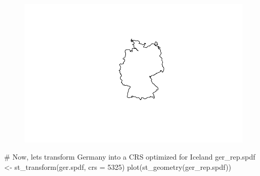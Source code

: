 \documentclass[
  letterpaper,
  DIV=11,
  numbers=noendperiod]{scrreprt}
\newenvironment{Shaded}{\begin{snugshade}}{\end{snugshade}}
\newcommand{\AttributeTok}[1]{\textcolor[rgb]{0.40,0.45,0.13}{#1}}
\newcommand{\CommentTok}[1]{\textcolor[rgb]{0.37,0.37,0.37}{#1}}
\newcommand{\DecValTok}[1]{\textcolor[rgb]{0.68,0.00,0.00}{#1}}
\newcommand{\FunctionTok}[1]{\textcolor[rgb]{0.28,0.35,0.67}{#1}}
\newcommand{\NormalTok}[1]{\textcolor[rgb]{0.00,0.23,0.31}{#1}}
\newcommand{\OtherTok}[1]{\textcolor[rgb]{0.00,0.23,0.31}{#1}}
\newcommand{\SpecialCharTok}[1]{\textcolor[rgb]{0.37,0.37,0.37}{#1}}
\newcommand{\StringTok}[1]{\textcolor[rgb]{0.13,0.47,0.30}{#1}}
\begin{document}
\begin{Shaded}
\end{Shaded}

\begin{figure}[H]

{\centering \includegraphics{01_refresher_short_files/figure-pdf/unnamed-chunk-5-1.pdf}

}

\end{figure}

\begin{Shaded}
\begin{Highlighting}[]
\CommentTok{\# Now, let\textquotesingle{}s transform Germany into a CRS optimized for Iceland}
\NormalTok{ger\_rep.spdf }\OtherTok{\textless{}{-}} \FunctionTok{st\_transform}\NormalTok{(ger.spdf, }\AttributeTok{crs =} \DecValTok{5325}\NormalTok{)}
\FunctionTok{plot}\NormalTok{(}\FunctionTok{st\_geometry}\NormalTok{(ger\_rep.spdf))}
\end{Highlighting}
\end{Shaded}
\end{document}
